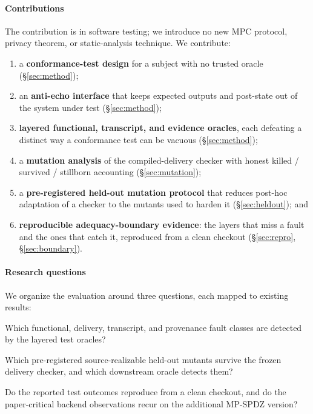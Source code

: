 \documentclass[conference]{IEEEtran}
\begin{document}
\paragraph{Contributions}
The contribution is in software testing; we introduce no new MPC protocol, privacy
theorem, or static-analysis technique. We contribute:
\begin{enumerate}[leftmargin=1.4em,itemsep=2pt]
\item a \textbf{conformance-test design} for a subject with no trusted oracle
(\S\ref{sec:method});
\item an \textbf{anti-echo interface} that keeps expected outputs and post-state out of
the system under test (\S\ref{sec:method});
\item \textbf{layered functional, transcript, and evidence oracles}, each defeating a
distinct way a conformance test can be vacuous (\S\ref{sec:method});
\item a \textbf{mutation analysis} of the compiled-delivery checker with honest killed /
survived / stillborn accounting (\S\ref{sec:mutation});
\item a \textbf{pre-registered held-out mutation protocol} that reduces post-hoc
adaptation of a checker to the mutants used to harden it (\S\ref{sec:heldout}); and
\item \textbf{reproducible adequacy-boundary evidence}: the layers that miss a fault and
the ones that catch it, reproduced from a clean checkout (\S\ref{sec:repro},
\S\ref{sec:boundary}).
\end{enumerate}

\paragraph{Research questions}
We organize the evaluation around three questions, each mapped to existing results:
\begin{description}[leftmargin=1.1em,itemsep=1pt]
\item[RQ1] Which functional, delivery, transcript, and provenance fault classes are
detected by the layered test oracles?
\item[RQ2] Which pre-registered source-realizable held-out mutants survive the frozen
delivery checker, and which downstream oracle detects them?
\item[RQ3] Do the reported test outcomes reproduce from a clean checkout, and do the
paper-critical backend observations recur on the additional MP-SPDZ version?
\end{description}
\end{document}
